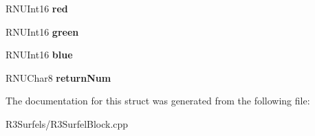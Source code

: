 \begin{DoxyCompactItemize}
\item 
R\+N\+U\+Int16 {\bfseries red}\hypertarget{struct_u_p_c_point_ae82a5477fc314959c4ba25125b6b7a25}{}\label{struct_u_p_c_point_ae82a5477fc314959c4ba25125b6b7a25}

\item 
R\+N\+U\+Int16 {\bfseries green}\hypertarget{struct_u_p_c_point_a8738b1e60af9bf0a88bf216a58d01e93}{}\label{struct_u_p_c_point_a8738b1e60af9bf0a88bf216a58d01e93}

\item 
R\+N\+U\+Int16 {\bfseries blue}\hypertarget{struct_u_p_c_point_a948d003d7e7f041f2ff8a8d3fdaee0a4}{}\label{struct_u_p_c_point_a948d003d7e7f041f2ff8a8d3fdaee0a4}

\item 
R\+N\+U\+Char8 {\bfseries return\+Num}\hypertarget{struct_u_p_c_point_ac098b7a9b9198ec12e8b4701a62a0d7a}{}\label{struct_u_p_c_point_ac098b7a9b9198ec12e8b4701a62a0d7a}

\end{DoxyCompactItemize}


The documentation for this struct was generated from the following file\+:\begin{DoxyCompactItemize}
\item 
R3\+Surfels/R3\+Surfel\+Block.\+cpp\end{DoxyCompactItemize}

